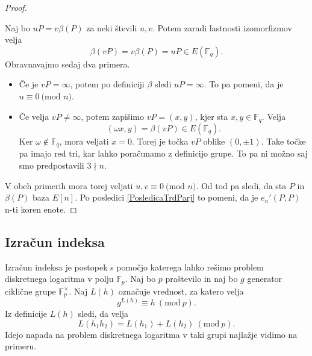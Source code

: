 \documentclass[12pt,a4paper,twoside]{article}
\theoremstyle{definition} %
\theoremstyle{plain} %
\numberwithin{equation}{section}  %
\newcommand{\F}{\mathbb F}
\newcommand{\E}[1]{E({#1})}
\newcommand{\MOD}[1]{\ \text{(mod }{#1}\text{)}}
\begin{document}
\begin{proof}~

Naj bo $uP = v\beta(P)$ za neki števili $u,v$. Potem zaradi lastnosti izomorfizmov velja
$$\beta(vP) = v\beta(P) = uP \in \E{\F_q}.$$
Obravnavajmo sedaj dva primera.
\begin{itemize}
\item Če je $vP = \infty$, potem po definiciji $\beta$ sledi $uP = \infty$. To pa pomeni, da je $u \equiv 0 \MOD{n}$.
\item Če velja $vP \neq \infty$, potem zapišimo $vP = (x,y)$, kjer sta $x,y \in \F_q$. Velja
$$(\omega x,y) = \beta(vP) \in \E{\F_q}.$$
Ker $\omega \notin \F_q$, mora veljati $x = 0$. Torej je točka $vP$ oblike $(0,\pm 1)$. Take točke pa imajo red tri, kar lahko poračunamo z definicijo grupe. To pa ni možno saj smo predpostavili $3 \nmid n$.
\end{itemize}

V obeh primerih mora torej veljati $u,v \equiv 0 \MOD{n}$. Od tod pa sledi, da sta $P$ in $\beta(P)$ baza $E[n]$. Po posledici \ref{PosledicaTrdParj} to pomeni, da je $e_n'(P,P)$ n-ti koren enote.

\end{proof}



\subsection{Izračun indeksa}
\label{IndexCalc}

Izračun indeksa je postopek s pomočjo katerega lahko rešimo problem diskretnega logaritma v polju $\F_p$.
Naj bo $p$ praštevilo in naj bo $g$ generator ciklične grupe $\F^{\times}_{p}$. Naj $L(h)$ označuje vrednost, za katero velja
$$g^{L(h)} \equiv h \ (\text{mod} \ p).$$
Iz definicije $L(h)$ sledi, da velja $$L(h_1h_2) = L(h_1)+L(h_2) \ (\text{mod} \ p).$$
Idejo napada na problem diskretnega logaritma v taki grupi najlažje vidimo na primeru.
\end{document}
